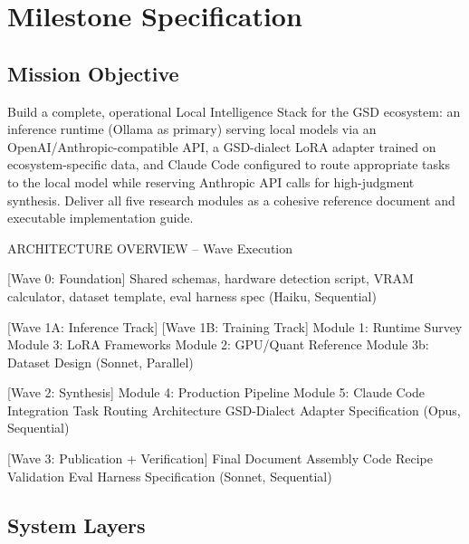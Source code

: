 \documentclass[11pt,letterpaper]{article}
\newcommand{\stageheader}[2]{%
  \noindent\colorbox{#2}{\makebox[\textwidth][l]{%
    \textcolor{white}{\bfseries\sffamily\hspace{6pt}#1\hspace{6pt}}}}%
  \vspace{0.5em}\par%
}
\begin{document}
\newpage
\stageheader{STAGE 3 --- MISSION PACKAGE}{tertiary}

\section{Milestone Specification}

\subsection{Mission Objective}

Build a complete, operational Local Intelligence Stack for the GSD ecosystem: an inference runtime (Ollama as primary) serving local models via an OpenAI/Anthropic-compatible API, a GSD-dialect LoRA adapter trained on ecosystem-specific data, and Claude Code configured to route appropriate tasks to the local model while reserving Anthropic API calls for high-judgment synthesis. Deliver all five research modules as a cohesive reference document and executable implementation guide.

\begin{asciibox}
ARCHITECTURE OVERVIEW -- Wave Execution

  [Wave 0: Foundation]
  Shared schemas, hardware detection script, VRAM calculator,
  dataset template, eval harness spec          (Haiku, Sequential)

  [Wave 1A: Inference Track]       [Wave 1B: Training Track]
  Module 1: Runtime Survey         Module 3: LoRA Frameworks
  Module 2: GPU/Quant Reference    Module 3b: Dataset Design
                   (Sonnet, Parallel)

  [Wave 2: Synthesis]
  Module 4: Production Pipeline
  Module 5: Claude Code Integration
  Task Routing Architecture
  GSD-Dialect Adapter Specification        (Opus, Sequential)

  [Wave 3: Publication + Verification]
  Final Document Assembly
  Code Recipe Validation
  Eval Harness Specification              (Sonnet, Sequential)
\end{asciibox}

\subsection{System Layers}
\end{document}
